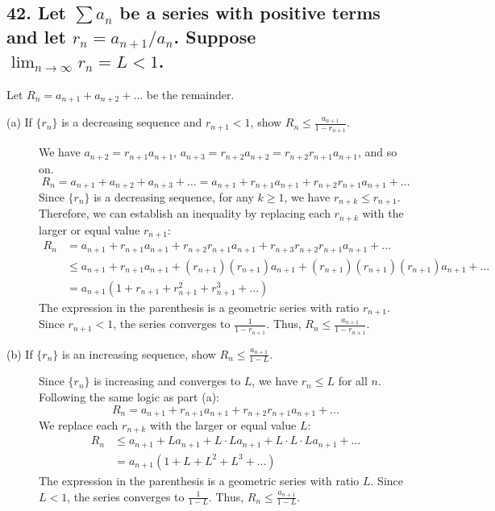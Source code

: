 \documentclass{article}
\begin{document}
\subsection*{42. Let $\sum a_n$ be a series with positive terms and let $r_n = a_{n+1}/a_n$. Suppose $\lim_{n\to\infty} r_n = L < 1$.}
Let $R_n = a_{n+1} + a_{n+2} + \dots$ be the remainder.
\begin{description}
    \item[(a) If $\{r_n\}$ is a decreasing sequence and $r_{n+1} < 1$, show $R_n \le \frac{a_{n+1}}{1-r_{n+1}}$.]
    We have $a_{n+2} = r_{n+1} a_{n+1}$, $a_{n+3} = r_{n+2} a_{n+2} = r_{n+2} r_{n+1} a_{n+1}$, and so on.
    \[ R_n = a_{n+1} + a_{n+2} + a_{n+3} + \dots = a_{n+1} + r_{n+1}a_{n+1} + r_{n+2}r_{n+1}a_{n+1} + \dots \]
    Since $\{r_n\}$ is a decreasing sequence, for any $k \ge 1$, we have $r_{n+k} \le r_{n+1}$.
    Therefore, we can establish an inequality by replacing each $r_{n+k}$ with the larger or equal value $r_{n+1}$:
    \begin{align*}
        R_n &= a_{n+1} + r_{n+1}a_{n+1} + r_{n+2}r_{n+1}a_{n+1} + r_{n+3}r_{n+2}r_{n+1}a_{n+1} + \dots \\
        &\le a_{n+1} + r_{n+1}a_{n+1} + (r_{n+1})(r_{n+1})a_{n+1} + (r_{n+1})(r_{n+1})(r_{n+1})a_{n+1} + \dots \\
        &= a_{n+1} (1 + r_{n+1} + r_{n+1}^2 + r_{n+1}^3 + \dots)
    \end{align*}
    The expression in the parenthesis is a geometric series with ratio $r_{n+1}$. Since $r_{n+1} < 1$, the series converges to $\frac{1}{1-r_{n+1}}$.
    Thus, $R_n \le \frac{a_{n+1}}{1-r_{n+1}}$.
    \item[(b) If $\{r_n\}$ is an increasing sequence, show $R_n \le \frac{a_{n+1}}{1-L}$.]
    Since $\{r_n\}$ is increasing and converges to $L$, we have $r_n \le L$ for all $n$.
    Following the same logic as part (a):
    \[ R_n = a_{n+1} + r_{n+1}a_{n+1} + r_{n+2}r_{n+1}a_{n+1} + \dots \]
    We replace each $r_{n+k}$ with the larger or equal value $L$:
    \begin{align*}
        R_n &\le a_{n+1} + L a_{n+1} + L \cdot L a_{n+1} + L \cdot L \cdot L a_{n+1} + \dots \\
        &= a_{n+1} (1 + L + L^2 + L^3 + \dots)
    \end{align*}
    The expression in the parenthesis is a geometric series with ratio $L$. Since $L < 1$, the series converges to $\frac{1}{1-L}$.
    Thus, $R_n \le \frac{a_{n+1}}{1-L}$.
\end{description}
\end{document}
